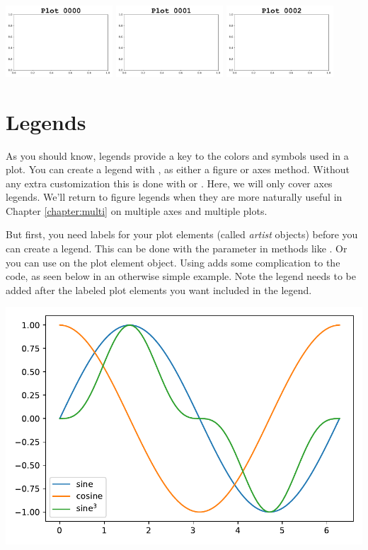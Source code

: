 \begin{center}
    \includegraphics[width = 0.3\textwidth]{figures/proseplots/0000.pdf} \includegraphics[width = 0.3\textwidth]{figures/proseplots/0001.pdf}
     \includegraphics[width = 0.3\textwidth]{figures/proseplots/0002.pdf}
\end{center}

\section{Legends}
As you should know, legends provide a key to the colors and symbols used in a plot. You can create a legend with , as either a figure or axes method. Without any extra customization this is done with  or . Here, we will only cover axes legends. We'll return to figure legends when they are more naturally useful in Chapter \ref{chapter:multi} on multiple axes and multiple plots. 

But first, you need labels for your plot elements (called \emph{artist} objects) before you can create a legend. This can be done with the  parameter in methods like . Or you can use  on the plot element object. Using  adds some complication to the code, as seen below in an otherwise simple example. Note the legend needs to be added after the labeled plot elements you want included in the legend.



\begin{center}
    \includegraphics[width = .7\textwidth]{figures/proseplots/legend-labels.pdf}
\end{center}

